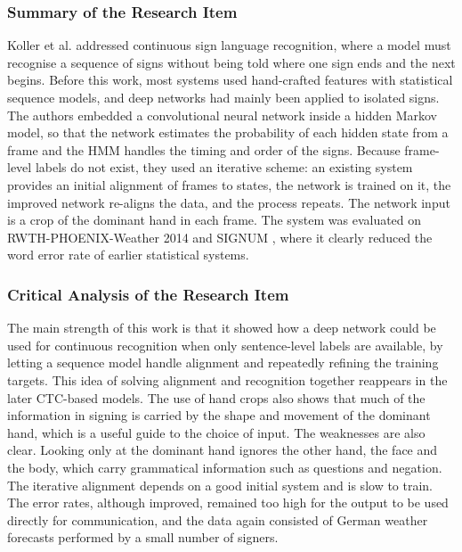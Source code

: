 \documentclass{FastFyp}
\begin{document}
\subsubsection*{Summary of the Research Item}
Koller et al. \cite{koller2016deepsign} addressed continuous sign language recognition, where a model must recognise a sequence of signs without being told where one sign ends and the next begins. Before this work, most systems used hand-crafted features with statistical sequence models, and deep networks had mainly been applied to isolated signs. The authors embedded a convolutional neural network inside a hidden Markov model, so that the network estimates the probability of each hidden state from a frame and the HMM handles the timing and order of the signs. Because frame-level labels do not exist, they used an iterative scheme: an existing system provides an initial alignment of frames to states, the network is trained on it, the improved network re-aligns the data, and the process repeats. The network input is a crop of the dominant hand in each frame. The system was evaluated on RWTH-PHOENIX-Weather 2014 \cite{koller2015phoenix} and SIGNUM \cite{vonagris2008signum}, where it clearly reduced the word error rate of earlier statistical systems.

\subsubsection*{Critical Analysis of the Research Item}
The main strength of this work is that it showed how a deep network could be used for continuous recognition when only sentence-level labels are available, by letting a sequence model handle alignment and repeatedly refining the training targets. This idea of solving alignment and recognition together reappears in the later CTC-based models. The use of hand crops also shows that much of the information in signing is carried by the shape and movement of the dominant hand, which is a useful guide to the choice of input. The weaknesses are also clear. Looking only at the dominant hand ignores the other hand, the face and the body, which carry grammatical information such as questions and negation. The iterative alignment depends on a good initial system and is slow to train. The error rates, although improved, remained too high for the output to be used directly for communication, and the data again consisted of German weather forecasts performed by a small number of signers.
\end{document}
